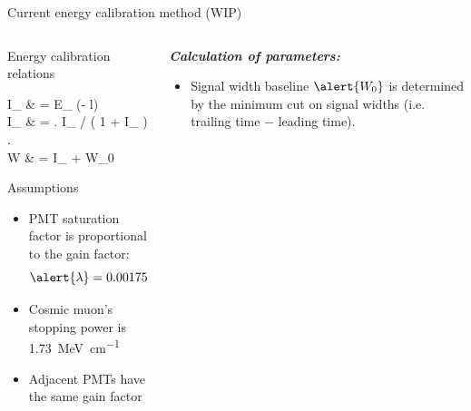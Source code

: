 \documentclass{ikpKoeln}
\begin{document}
\begin{frame}[t]{Current energy calibration method (WIP)}
	\setcounter{equation}{0}
	\vspace*{-0.5em}
	\begin{columns}[c]
		\begin{column}{0.45 \textwidth}
			\vspace{-1.5em}
			\begin{alertblock}{Energy calibration relations}
				\setlength{\abovedisplayskip}{0pt}
				\setlength{\belowdisplayskip}{0pt}
				\setlength{\abovedisplayshortskip}{0pt}
				\setlength{\belowdisplayshortskip}{0pt}
				\begin{flalign}
					I_ & = E_ \cdot \exp(-\alert{\alpha} \cdot l)                                           \\
					I_ & = \left. I_ \middle/ \left( 1 + \alert{\lambda} \cdot I_ \right) \right. \\
					W            & = \alert{} \cdot I_ + \alert{W_0}
				\end{flalign}
			\end{alertblock}
			\vspace{-0.5em}
			\begin{exampleblock}{Assumptions}
				\begin{itemize}
					\setlength\itemsep{0em}
					\item PMT saturation factor is proportional to the gain factor: \vspace{-1em}$$\alert{\lambda} = 0.00175 \times \alert{\mathcal{G}}$$
					\item \vspace{-1em}Cosmic muon's stopping power is \qty{1.73}{\mega\electronvolt\per\centi\metre}
					\item Adjacent PMTs have the same gain factor
				\end{itemize}
			\end{exampleblock}
		\end{column}
		\begin{column}{0.45 \textwidth}
			\textit{\textbf{Calculation of parameters:}}
			{\small
				\begin{itemize}
					\setlength\itemsep{0em}
					\item Signal width baseline $\alert{W_0}$ is determined by the minimum cut on signal widths (i.e. trailing time $-$ leading time).

\end{itemize}}
\end{column}
\end{columns}
\end{frame}
\end{document}
